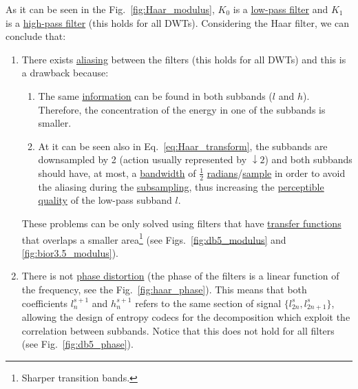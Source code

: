 As it can be seen in the Fig.~\ref{fig:Haar_modulus}, $K_0$ is a
\href{https://en.wikipedia.org/wiki/Low-pass_filter}{low-pass filter}
and $K_1$ is a
\href{https://en.wikipedia.org/wiki/High-pass_filter}{high-pass
  filter} (this holds for all DWTs). Considering the Haar filter, we
can conclude that:
\begin{enumerate}
\item There exists
  \href{https://en.wikipedia.org/wiki/Aliasing}{aliasing} between the
  filters (this holds for all DWTs) and this is a drawback because:
  \begin{enumerate}
  \item The same
    \href{https://en.wikipedia.org/wiki/Information}{information} can
    be found in both subbands ($l$ and $h$). Therefore, the
    concentration of the energy in one of the subbands is smaller.
  \item At it can be seen also in Eq.~\ref{eq:Haar_transform}, the
    subbands are downsampled by 2 (action usually represented by
    $\downarrow 2$) and both subbands should have, at most, a
    \href{https://en.wikipedia.org/wiki/Bandwidth_(signal_processing)}{bandwidth}
    of $\frac{1}{2}$
    \href{https://en.wikipedia.org/wiki/Radian}{radians}/\href{https://en.wikipedia.org/wiki/Sampling_(signal_processing)}{sample}
    in order to avoid the aliasing during the
    \href{https://en.wikipedia.org/wiki/Downsampling_(signal_processing)}{subsampling},
    thus increasing the
    \href{https://en.wikipedia.org/wiki/Perception}{perceptible}
    \href{https://en.wikipedia.org/wiki/Signal-to-noise_ratio}{quality}
    of the low-pass subband $l$.
  \end{enumerate}
  These problems can be only solved using filters that have
  \href{https://en.wikipedia.org/wiki/Transfer_function}{transfer
    functions} that overlaps a smaller area\footnote{Sharper
  transition bands.} (see Figs.~\ref{fig:db5_modulus} and
  \ref{fig:bior3.5_modulus}).
\item There is not
  \href{https://en.wikipedia.org/wiki/Linear_phase}{phase distortion}
  (the phase of the filters is a linear function of the frequency, see
  the Fig.~\ref{fig:haar_phase}). This means that both coefficients
  $l^{s+1}_n$ and $h^{s+1}_n$ refers to the same section of signal
  $\{l^s_{2n}, l^s_{2n+1}\}$, allowing the design of entropy codecs
  for the decomposition which exploit the correlation between
  subbands. Notice that this does not hold for all filters (see
  Fig.~\ref{fig:db5_phase}).
\end{enumerate}

